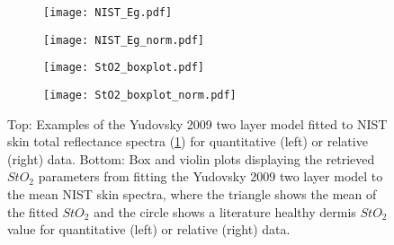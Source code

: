 \begin{figure}[h]
    \centering
    \begin{subfigure}{0.49\textwidth}
        \texttt{[image: NIST\_Eg.pdf]}
        \caption{}
        \label{fig:egspectraNIST}
    \end{subfigure}
    \begin{subfigure}{0.49\textwidth}
        \texttt{[image: NIST\_Eg\_norm.pdf]}
        \caption{}
        \label{fig:egspectraNISTnorm}
    \end{subfigure}
    \begin{subfigure}{0.49\textwidth}
        \texttt{[image: StO2\_boxplot.pdf]}
        \caption{}
        \label{fig:egparamStO2NIST}
    \end{subfigure}
    \begin{subfigure}{0.49\textwidth}
        \texttt{[image: StO2\_boxplot\_norm.pdf]}
        \caption{}
        \label{fig:egparamStO2NISTnorm}
    \end{subfigure}
    \caption{Top: Examples of the Yudovsky 2009 two layer model fitted to NIST skin total reflectance spectra (\ref{fig:egspectraNIST}) for quantitative (left) or relative (right) data. Bottom: Box and violin plots displaying the retrieved $StO_2$ parameters from fitting the Yudovsky 2009 two layer model to the mean NIST skin spectra, where the triangle shows the mean of the fitted $StO_2$ and the circle shows a literature healthy dermis $StO_2$ value \cite{VanManen2021} for quantitative (left) or relative (right) data.}
    \label{fig:NIST}
\end{figure}
